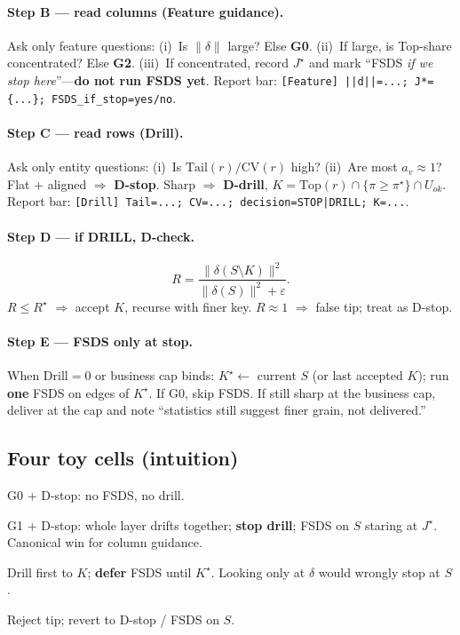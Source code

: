 \documentclass[11pt]{article}
\newcommand{\Drill}{\mathrm{Drill}}
\begin{document}
\paragraph{Step B --- read columns (Feature guidance).}
Ask only feature questions:
(i)~Is \(\|\delta\|\) large? Else \textbf{G0}.
(ii)~If large, is Top-share concentrated? Else \textbf{G2}.
(iii)~If concentrated, record \(J^\star\) and mark
``FSDS \emph{if we stop here}''---\textbf{do not run FSDS yet}.
Report bar:
\texttt{[Feature] ||d||=...; J*=\{...\}; FSDS\_if\_stop=yes/no}.

\paragraph{Step C --- read rows (Drill).}
Ask only entity questions:
(i)~Is \(\mathrm{Tail}(r)/\mathrm{CV}(r)\) high?
(ii)~Are most \(a_v\approx 1\)?
Flat + aligned \(\Rightarrow\) \textbf{D-stop}.
Sharp \(\Rightarrow\) \textbf{D-drill},
\(K=\mathrm{Top}(r)\cap\{\pi\ge\pi^\star\}\cap U_{ok}\).
Report bar:
\texttt{[Drill] Tail=...; CV=...; decision=STOP|DRILL; K=...}.

\paragraph{Step D --- if DRILL, D-check.}
\[
  R
  =\frac{\|\delta(S\setminus K)\|^2}{\|\delta(S)\|^2+\varepsilon}.
\]
\(R\le R^\star\) \(\Rightarrow\) accept \(K\), recurse with finer key.
\(R\approx 1\) \(\Rightarrow\) false tip; treat as D-stop.

\paragraph{Step E --- FSDS only at stop.}
When \(\Drill=0\) or business cap binds:
\(K^\star\leftarrow\) current \(S\) (or last accepted \(K\));
run \textbf{one} FSDS on edges of \(K^\star\).
If G0, skip FSDS. If still sharp at the business cap, deliver at
the cap and note ``statistics still suggest finer grain, not
delivered.''

\subsection{Four toy cells (intuition)}
\begin{description}[leftmargin=1.4em,itemsep=0.4em]
  \item[Small \(\|\delta\|\), flat \(r\)]
        G0 + D-stop: no FSDS, no drill.
  \item[Large \(\|\delta\|\), flat \(r\), \(a_v\approx 1\)]
        G1 + D-stop: whole layer drifts together; \textbf{stop
        drill}; FSDS on \(S\) staring at \(J^\star\).
        Canonical win for column guidance.
  \item[Large \(\|\delta\|\), sharp \(r\)]
        Drill first to \(K\); \textbf{defer} FSDS until \(K^\star\).
        Looking only at \(\delta\) would wrongly stop at \(S\).
  \item[Sharp \(r\) but \(R\approx 1\)]
        Reject tip; revert to D-stop / FSDS on \(S\).
\end{description}
\end{document}
